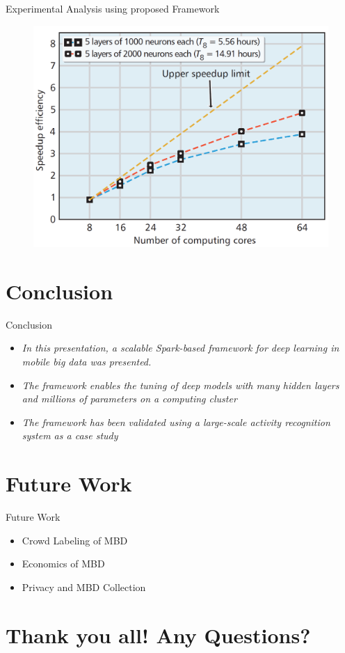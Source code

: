 \documentclass[newPxFont]{beamer}
\begin{document}
\begin{frame}[allowframebreaks]{Experimental Analysis using proposed Framework}
    
   	\framebreak 
    
    \begin{figure}
    	\centering
        \includegraphics[width=.70\linewidth]{resources/analysis3.png}
        \label{fig:computingCore}
    \end{figure}
    
\end{frame}

\section{Conclusion}
\begin{frame}{Conclusion}
  \begin{itemize}
      \item{\textit{In this presentation, a scalable Spark-based framework for deep learning in mobile big data was presented.}}
      \item{\textit{The framework enables the tuning of deep models with many hidden layers and millions of parameters on a computing cluster}}
      \item{\textit{The framework has been validated using a large-scale activity recognition system as a case study}}
  \end{itemize}
\end{frame}

\section{Future Work}

\begin{frame}{Future Work}
\begin{itemize}
	\item{\alert{Crowd Labeling of MBD}
    }
    \item{\alert{Economics of MBD}}
    \item{\alert{Privacy and MBD Collection}}
\end{itemize}
\end{frame}

\section{Thank you all!  Any Questions?}
\end{document}
